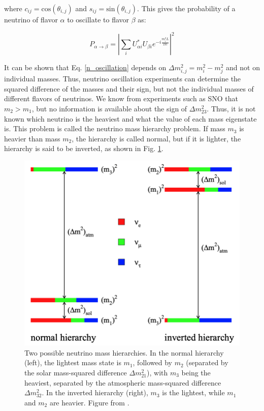 where $c_{ij}=\mathrm{cos}(\theta_{i,j})$ and $s_{ij}=\mathrm{sin}(\theta_{i,j})$. This gives the probability of a neutrino of flavor $\alpha$ to oscillate to flavor $\beta$ as:

\begin{equation}\label{n_oscillation}
P_{\alpha\rightarrow\beta} = \left|\sum_i U^*_{\alpha i}U_{\beta i} e^{-i\frac{m_i^2L}{2E}}\right|^2
\end{equation}

It can be shown that Eq. \ref{n_oscillation} depends on $\Delta m^2_{i,j}=m^2_i-m^2_j$ and not on individual masses. Thus, neutrino oscillation experiments can determine the squared difference of the masses and their sign, but not the individual masses of different flavors of neutrinos. We know from experiments such as SNO that $m_2>m_1$, but no information is available about the sign of $\Delta m_{23}^2$. Thus, it is not known which neutrino is the heaviest and what the value of each mass eigenstate is. This problem is called the neutrino mass hierarchy problem. If mass $m_3$ is heavier than mass $m_2$, the hierarchy is called normal, but if it is lighter, the hierarchy is said to be inverted, as shown in Fig. \ref{mass_hierarchies_fig}.

\begin{figure}[!htb]
\centering
\includegraphics[width=0.7\linewidth]{ch1/figs/mass_hierarchies.png}
\caption{Two possible neutrino mass hierarchies. In the normal hierarchy (left), the lightest mass state is \( m_1 \), followed by \( m_2 \) (separated by the solar mass-squared difference \( \Delta m^2_{21} \)), with \( m_3 \) being the heaviest, separated by the atmospheric mass-squared difference \( \Delta m^2_{32} \). In the inverted hierarchy (right), \( m_3 \) is the lightest, while \( m_1 \) and \( m_2 \) are heavier. Figure from \cite{Hewett:2012ns}.}
\label{mass_hierarchies_fig}
\end{figure}

